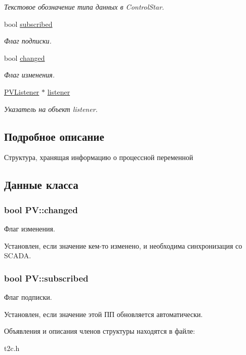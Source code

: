 \begin{DoxyCompactItemize}
\begin{DoxyCompactList}\small\item\em Текстовое обозначение типа данных в Control\-Star. \end{DoxyCompactList}\item 
bool \hyperlink{struct_p_v_a865f200b8c4ea2cb89894e7133245bb7}{subscribed}
\begin{DoxyCompactList}\small\item\em Флаг подписки. \end{DoxyCompactList}\item 
bool \hyperlink{struct_p_v_ab53638c0e66c5b2b86cea564f02e2947}{changed}
\begin{DoxyCompactList}\small\item\em Флаг изменения. \end{DoxyCompactList}\item 
\hypertarget{struct_p_v_ab0718ffead2b27c26125e83475de016b}{\hyperlink{class_p_v_listener}{P\-V\-Listener} $\ast$ \hyperlink{struct_p_v_ab0718ffead2b27c26125e83475de016b}{listener}}\label{struct_p_v_ab0718ffead2b27c26125e83475de016b}

\begin{DoxyCompactList}\small\item\em Указатель на объект listener. \end{DoxyCompactList}\end{DoxyCompactItemize}


\subsection{Подробное описание}
Структура, хранящая информацию о процессной переменной 

\subsection{Данные класса}
\hypertarget{struct_p_v_ab53638c0e66c5b2b86cea564f02e2947}{
\subsubsection[{changed}]{\setlength{\rightskip}{0pt plus 5cm}bool P\-V\-::changed}}\label{struct_p_v_ab53638c0e66c5b2b86cea564f02e2947}


Флаг изменения. 

Установлен, если значение кем-\/то изменено, и необходима синхронизация со S\-C\-A\-D\-A. \hypertarget{struct_p_v_a865f200b8c4ea2cb89894e7133245bb7}{
\subsubsection[{subscribed}]{\setlength{\rightskip}{0pt plus 5cm}bool P\-V\-::subscribed}}\label{struct_p_v_a865f200b8c4ea2cb89894e7133245bb7}


Флаг подписки. 

Установлен, если значение этой ПП обновляется автоматически. 

Объявления и описания членов структуры находятся в файле\-:\begin{DoxyCompactItemize}
\item 
t2c.\-h\end{DoxyCompactItemize}
